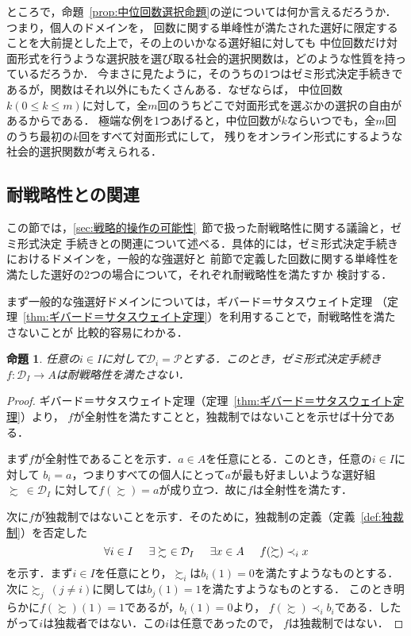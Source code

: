 \documentclass[dvipdfmx]{jsarticle}
\newtheorem{proposition}[definition]{命題}
\begin{document}
ところで，命題~\ref{prop:中位回数選択命題}の逆については何か言えるだろうか．つまり，個人のドメインを，
回数に関する単峰性が満たされた選好に限定することを大前提とした上で，その上のいかなる選好組に対しても
中位回数だけ対面形式を行うような選択肢を選び取る社会的選択関数は，どのような性質を持っているだろうか．
今まさに見たように，そのうちの1つはゼミ形式決定手続きであるが，関数はそれ以外にもたくさんある．なぜならば，
中位回数$k(0 \leq k \leq m)$に対して，全$m$回のうちどこで対面形式を選ぶかの選択の自由があるからである．
極端な例を1つあげると，中位回数が$k$ならいつでも，全$m$回のうち最初の$k$回をすべて対面形式にして，
残りをオンライン形式にするような社会的選択関数が考えられる．



\subsection{耐戦略性との関連}\label{subsec:耐戦略性との関連}
  この節では，\ref{sec:戦略的操作の可能性}~節で扱った耐戦略性に関する議論と，ゼミ形式決定
  手続きとの関連について述べる．具体的には，ゼミ形式決定手続きにおけるドメインを，一般的な強選好と
  前節で定義した回数に関する単峰性を満たした選好の2つの場合について，それぞれ耐戦略性を満たすか
  検討する．

  まず一般的な強選好ドメインについては，ギバード＝サタスウェイト定理
  （定理~\ref{thm:ギバード＝サタスウェイト定理}）を利用することで，耐戦略性を満たさないことが
  比較的容易にわかる．

  \begin{proposition}
    任意の$i \in I$に対して$\mathcal{D}_i = \mathcal{P}$とする．このとき，ゼミ形式決定手続き
    $f\colon \mathcal{D}_I \to A$は耐戦略性を満たさない．
  \end{proposition}
    
  \begin{proof}
    ギバード＝サタスウェイト定理（定理~\ref{thm:ギバード＝サタスウェイト定理}）より，
    $f$が全射性を満たすことと，独裁制ではないことを示せば十分である．

    まず$f$が全射性であることを示す．$a \in A$を任意にとる．このとき，任意の$i \in I$に対して
    $b_i = a$，つまりすべての個人にとって$a$が最も好ましいような選好組$\succsim \ \in \mathcal{D}_I$
    に対して$f(\succsim) = a$が成り立つ．故に$f$は全射性を満たす．

    次に$f$が独裁制ではないことを示す．そのために，独裁制の定義（定義~\ref{def:独裁制}）を否定した
    \begin{equation*}
      \forall i \in I \hspace{5mm} \exists \succsim \ \in \mathcal{D}_I \hspace{5mm} 
      \exists x \in A \hspace{5mm} f(\succsim) \prec_i x
    \end{equation*}
    を示す．まず$i \in I$を任意にとり，$\succsim_i$は$b_i(1)=0$を満たすようなものとする．
    次に$\succsim_j\ (j \neq i)$に関しては$b_j(1) = 1$を満たすようなものとする．
    このとき明らかに$f(\succsim)(1) = 1$であるが，$b_i(1)=0$より，
    $f(\succsim) \prec_i b_i$である．したがって$i$は独裁者ではない．この$i$は任意であったので，
    $f$は独裁制ではない．
  \end{proof}
\end{document}
